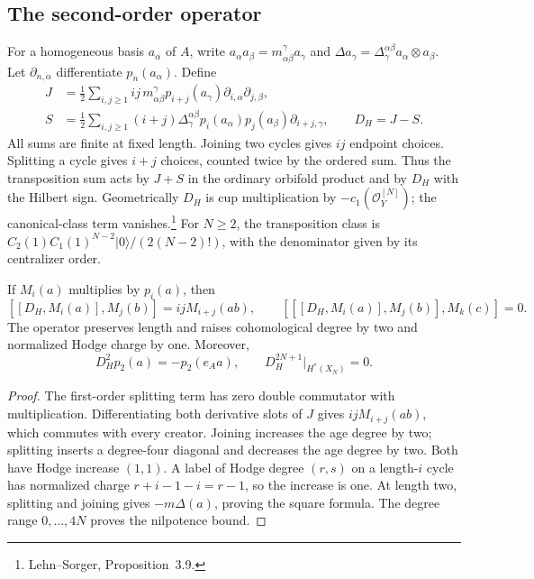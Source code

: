 \subsection{The second-order operator}

For a homogeneous basis \(a_\alpha\) of \(A\), write
\(a_\alpha a_\beta=m_{\alpha\beta}^{\gamma}a_\gamma\) and
\(\Delta a_\gamma=\Delta_\gamma^{\alpha\beta}
 a_\alpha\otimes a_\beta\).  Let \(\partial_{n,\alpha}\)
differentiate \(p_n(a_\alpha)\).  Define
\begin{align*}
 J&=\frac12\sum_{i,j\ge1}ij\,m_{\alpha\beta}^{\gamma}
 p_{i+j}(a_\gamma)\partial_{i,\alpha}\partial_{j,\beta},\\
 S&=\frac12\sum_{i,j\ge1}(i+j)\Delta_\gamma^{\alpha\beta}
 p_i(a_\alpha)p_j(a_\beta)\partial_{i+j,\gamma},
 \qquad D_H=J-S.
\end{align*}
All sums are finite at fixed length.  Joining two cycles gives
\(ij\) endpoint choices.  Splitting a cycle gives \(i+j\)
choices, counted twice by the ordered sum.  Thus the transposition
sum acts by \(J+S\) in the ordinary orbifold product and by
\(D_H\) with the Hilbert sign.  Geometrically \(D_H\) is cup
multiplication by \(-c_1(\mathcal O_Y^{[N]})\); the canonical-class
term vanishes.\footnote{Lehn--Sorger, Proposition~3.9.}
For \(N\ge2\), the transposition class is
\(C_2(1)C_1(1)^{N-2}|0\rangle/(2(N-2)!)\), with the denominator
given by its centralizer order.

\begin{proposition}\label{prop:zbps-joining}
If \(M_i(a)\) multiplies by \(p_i(a)\), then
\[
 [[D_H,M_i(a)],M_j(b)]=ijM_{i+j}(ab),\qquad
 [[[D_H,M_i(a)],M_j(b)],M_k(c)]=0.
\]
The operator preserves length and raises cohomological degree by
two and normalized Hodge charge by one.  Moreover,
\[
 D_H^2p_2(a)=-p_2(e_Aa),\qquad
 D_H^{2N+1}|_{H^*(X_N)}=0.
\]
\end{proposition}
\begin{proof}
The first-order splitting term has zero double commutator with
multiplication.  Differentiating both derivative slots of \(J\)
gives \(ijM_{i+j}(ab)\), which commutes with every creator.
Joining increases the age degree by two; splitting inserts a
degree-four diagonal and decreases the age degree by two.
Both have Hodge increase \((1,1)\).  A label of Hodge degree
\((r,s)\) on a length-\(i\) cycle has normalized charge
\(r+i-1-i=r-1\), so the increase is one.
At length two, splitting and joining gives \(-m\Delta(a)\),
proving the square formula.  The degree range \(0,\ldots,4N\)
proves the nilpotence bound.
\end{proof}

